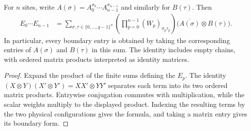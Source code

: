 \begin{lemma}
    \label{lem:lvv_weighted_transfer_product}
    \leanok
    For $n$ sites, write $A(\sigma)=A_0^{\sigma_0}\cdots
        A_{n-1}^{\sigma_{n-1}}$ and similarly for $B(\tau)$.
    Then
    \begin{align*}
        E_0\cdots E_{n-1}
         & =\sum_{\sigma,\tau\in\{0,\ldots,q-1\}^n}
        \left(\prod_{p=0}^{n-1}(W_p)_{\sigma_p\tau_p}\right)
        \bigl(\overline{A(\sigma)}\otimes B(\tau)\bigr).
    \end{align*}
    In particular, every boundary entry is obtained by taking the
    corresponding entries of $A(\sigma)$ and $B(\tau)$ in this sum.
    The identity includes empty chains, with ordered matrix products
    interpreted as identity matrices.
\end{lemma}
\begin{proof}\leanok
    Expand the product of the finite sums defining the $E_p$.
    The identity $(X\otimes Y)(X'\otimes Y')=XX'\otimes YY'$
    separates each term into its two ordered matrix products.
    Entrywise conjugation commutes with multiplication, while the
    scalar weights multiply to the displayed product.
    Indexing the resulting terms by the two physical configurations
    gives the formula, and taking a matrix entry gives its boundary form.
\end{proof}


